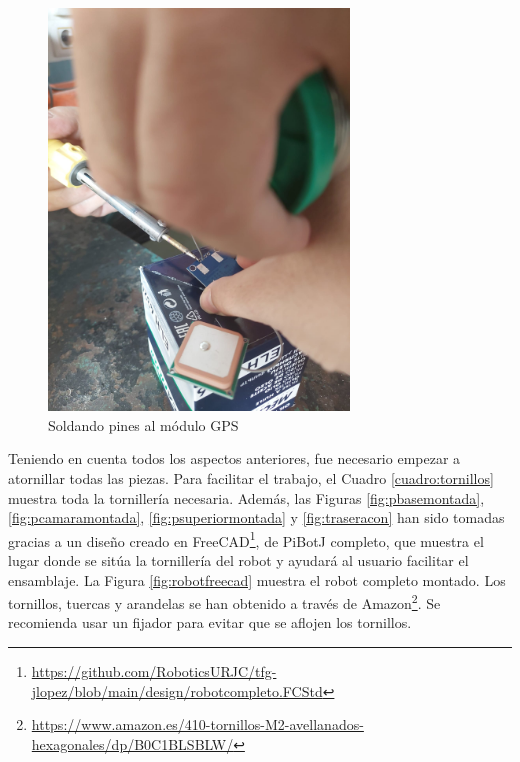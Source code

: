 \begin{figure} [h!]
	\begin{center}
		\includegraphics[width=8cm]{figs/cap5/soldar.jpeg}
	\end{center}
	\caption{Soldando pines al módulo GPS} 
	\label{fig:soldar}
\end{figure}

Teniendo en cuenta todos los aspectos anteriores, fue necesario empezar a atornillar todas las piezas. Para facilitar el trabajo, el Cuadro \ref{cuadro:tornillos} muestra toda la tornillería necesaria. Además, las Figuras \ref{fig:pbasemontada}, \ref{fig:pcamaramontada}, \ref{fig:psuperiormontada} y \ref{fig:traseracon} han sido tomadas gracias a un diseño creado en FreeCAD\footnote{\url{https://github.com/RoboticsURJC/tfg-jlopez/blob/main/design/robotcompleto.FCStd}}, de PiBotJ completo, que muestra el lugar donde se sitúa la tornillería del robot y ayudará al usuario facilitar el ensamblaje. La Figura \ref{fig:robotfreecad} muestra el robot completo montado. Los tornillos, tuercas y arandelas se han obtenido a través de Amazon\footnote{\url{https://www.amazon.es/410-tornillos-M2-avellanados-hexagonales/dp/B0C1BLSBLW/}}. Se recomienda usar un fijador para evitar que se aflojen los tornillos.

